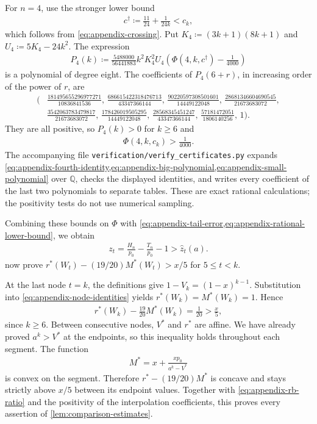 For $n=4$, use the stronger lower bound
\begin{align*}
c^\dagger\coloneqq\frac{11}{24}+\frac1{24k}<c_k,
\end{align*}
which follows from \cref{eq:appendix-crossing}. Put $K_4\coloneqq(3k+1)(8k+1)$ and $U_4\coloneqq5K_4-24k^2$. The expression
\begin{align}\label{eq:appendix-small-polynomial}
P_4(k)\coloneqq\frac{5488000}{56441883}k^2K_4^2U_4
\left(\Phi(4,k,c^\dagger)-\frac1{4000}\right)
\end{align}
is a polynomial of degree eight. The coefficients of $P_4(6+r)$, in increasing order of the power of $r$, are
\begin{align*}
\bigg(&\frac{181495655296977271}{10836841536},\,
\frac{686615422318476713}{43347366144},\,
\frac{90220597308501601}{14449122048},\,
\frac{28681346604690545}{21673683072},\\
&\frac{3542063783479817}{21673683072},\,
\frac{178426019505295}{14449122048},\,
\frac{28568345451247}{43347366144},\,
\frac{57181472051}{1806140256},\,1\bigg).
\end{align*}
They are all positive, so $P_4(k)>0$ for $k\ge6$ and
\begin{align*}
\Phi(4,k,c_k)>\frac1{4000}.
\end{align*}
The accompanying file \texttt{verification/verify\_certificates.py} expands \cref{eq:appendix-fourth-identity,eq:appendix-big-polynomial,eq:appendix-small-polynomial} over $\mathbb Q$, checks the displayed identities, and writes every coefficient of the last two polynomials to separate tables. These are exact rational calculations; the positivity tests do not use numerical sampling.

Combining these bounds on $\Phi$ with \cref{eq:appendix-tail-error,eq:appendix-rational-lower-bound}, we obtain
\begin{align*}
z_t=\frac{H_n}{p_0}-\frac{T_n}{p_0}-1>\widehat z_t(a).
\end{align*}
 now prove $r^*(W_t)-(19/20)M^*(W_t)>x/5$ for $5\le t<k$.

At the last node $t=k$, the definitions give $1-V_k=(1-x)^{k-1}$. Substitution into \cref{eq:appendix-node-identities} yields $r^*(W_k)=M^*(W_k)=1$. Hence
\begin{align*}
r^*(W_k)-\frac{19}{20}M^*(W_k)=\frac1{20}>\frac x5,
\end{align*}
since $k\ge6$. Between consecutive nodes, $V^*$ and $r^*$ are affine. We have already proved $a^k>V^*$ at the endpoints, so this inequality holds throughout each segment. The function
\begin{align*}
M^*=x+\frac{xp_0}{a^k-V^*}
\end{align*}
is convex on the segment. Therefore $r^*-(19/20)M^*$ is concave and stays strictly above $x/5$ between its endpoint values. Together with \cref{eq:appendix-rb-ratio} and the positivity of the interpolation coefficients, this proves every assertion of \cref{lem:comparison-estimates}.
